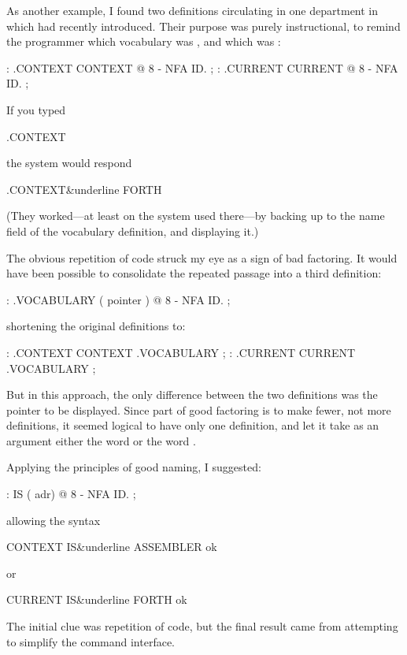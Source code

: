 As another example, I found two definitions circulating in one
department in which \Forth{} had recently introduced. Their purpose
was purely instructional, to remind the programmer which vocabulary
was , and which was :

\begin{Code}
: .CONTEXT   CONTEXT @  8 -  NFA  ID.   ;
: .CURRENT   CURRENT @  8 -  NFA  ID.  ;
\end{Code}
\goodbreak
\noindent If you typed

\begin{Code}
.CONTEXT
\end{Code}
the system would respond

\begin{Code}[commandchars=\&\{\}]
.CONTEXT&underline{ FORTH}
\end{Code}
(They worked---at least on the system used there---by backing up to the
name field of the vocabulary definition, and displaying it.)

The obvious repetition of code struck my eye as a sign of bad
factoring. It would have been possible to consolidate the repeated
passage into a third definition:

\begin{Code}
: .VOCABULARY   ( pointer )  @  8 -  NFA  ID. ;
\end{Code}
shortening the original definitions to:

\begin{Code}
: .CONTEXT   CONTEXT .VOCABULARY ;
: .CURRENT   CURRENT .VOCABULARY ;
\end{Code}
But in this approach, the only difference between the two definitions
was the pointer to be displayed. Since part of good factoring is to
make fewer, not more definitions, it seemed logical to have only one
definition, and let it take as an argument either the word
 or the word .

\medbreak
Applying the principles of good naming, I suggested:

\begin{Code}
: IS  ( adr)   @  8 -  NFA  ID. ;
\end{Code}
allowing the syntax

\begin{Code}[commandchars=\&\{\}]
CONTEXT IS&underline{ ASSEMBLER ok}
\end{Code}
or

\begin{Code}[commandchars=\&\{\}]
CURRENT IS&underline{ FORTH ok}
\end{Code}
The initial clue was repetition of code, but the final result came
from attempting to simplify the command interface.

